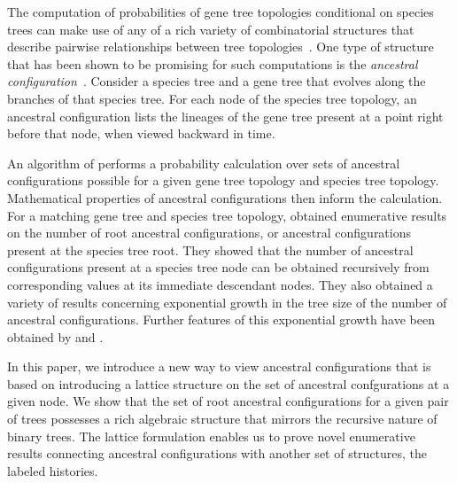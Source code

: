 \documentclass[10pt]{article}
\begin{document}
The computation of probabilities of gene tree topologies conditional on species trees can make use of any of a rich variety of combinatorial structures that describe pairwise relationships between tree topologies~\citep{degnan2005gene, rosenberg2007counting, degnanRosenbergStadler2012, degnanStadler2012polynomial, wu2012coalescent, wu2016cpct}. One type of structure that has been shown to be promising for such computations is the \emph{ancestral configuration}~\citep{wu2012coalescent}. Consider a species tree and a gene tree that evolves along the branches of that species tree. For each node of the species tree topology, an ancestral configuration lists the lineages of the gene tree present at a point right before that node, when viewed backward in time.

An algorithm of \cite{wu2012coalescent} performs a probability calculation over sets of ancestral configurations possible for a given gene tree topology and species tree topology. Mathematical properties of ancestral configurations then inform the calculation. For a matching gene tree and species tree topology, \cite{disanto2017enumeration} obtained enumerative results on the number of root ancestral configurations, or ancestral configurations present at the species tree root. They showed that the number of ancestral configurations present at a species tree node can be obtained recursively from corresponding values at its immediate descendant nodes. They also obtained a variety of results concerning exponential growth in the tree size of the number of ancestral configurations. Further features of this exponential growth have been obtained by \cite{disanto2022distributions} and \cite{disanto2024distributions}.

In this paper, we introduce a new way to view ancestral configurations that is based on introducing a lattice structure on the set of ancestral confgurations at a given node. We show that the set of root ancestral configurations for a given pair of trees possesses a rich algebraic structure that mirrors the recursive nature of binary trees. The lattice formulation enables us to prove novel enumerative results connecting ancestral configurations with another set of structures, the labeled histories. 
\end{document}
